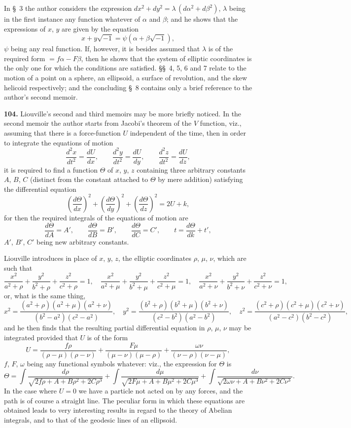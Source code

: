 \documentclass[11pt,a4paper]{article}
\theoremstyle{definition}
\begin{document}
In \S~3 the author considers the expression $dx^2 + dy^2 = \lambda\,(d\alpha^2 + d\beta^2)$, $\lambda$ being in the first instance any function whatever of $\alpha$ and $\beta$; and he shows that the expressions of $x$, $y$ are given by the equation
\[
x + y\sqrt{-1} = \psi(\alpha + \beta\sqrt{-1}),
\]
$\psi$ being any real function. If, however, it is besides assumed that $\lambda$ is of the required form $= f\alpha - F\beta$, then he shows that the system of elliptic coordinates is the only one for which the conditions are satisfied. \S\S~4, 5, 6 and 7 relate to the motion of a point on a sphere, an ellipsoid, a surface of revolution, and the skew helicoid respectively; and the concluding \S~8 contains only a brief reference to the author's second memoir.

\textbf{104.} Liouville's second and third memoirs may be more briefly noticed. In the second memoir the author starts from Jacobi's theorem of the $V$ function, viz., assuming that there is a force-function $U$ independent of the time, then in order to integrate the equations of motion
\[
\frac{d^2x}{dt^2} = \frac{dU}{dx}, \qquad \frac{d^2y}{dt^2} = \frac{dU}{dy}, \qquad \frac{d^2z}{dt^2} = \frac{dU}{dz},
\]
it is required to find a function $\Theta$ of $x$, $y$, $z$ containing three arbitrary constants $A$, $B$, $C$ (distinct from the constant attached to $\Theta$ by mere addition) satisfying the differential equation
\[
\left(\frac{d\Theta}{dx}\right)^2 + \left(\frac{d\Theta}{dy}\right)^2 + \left(\frac{d\Theta}{dz}\right)^2 = 2U + k,
\]
for then the required integrals of the equations of motion are
\[
\frac{d\Theta}{dA} = A', \qquad \frac{d\Theta}{dB} = B', \qquad \frac{d\Theta}{dC} = C', \qquad t = \frac{d\Theta}{dk} + t',
\]
$A'$, $B'$, $C'$ being new arbitrary constants.

Liouville introduces in place of $x$, $y$, $z$, the elliptic coordinates $\rho$, $\mu$, $\nu$, which are such that
\[
\frac{x^2}{a^2 + \rho} + \frac{y^2}{b^2 + \rho} + \frac{z^2}{c^2 + \rho} = 1, \quad
\frac{x^2}{a^2 + \mu} + \frac{y^2}{b^2 + \mu} + \frac{z^2}{c^2 + \mu} = 1, \quad
\frac{x^2}{a^2 + \nu} + \frac{y^2}{b^2 + \nu} + \frac{z^2}{c^2 + \nu} = 1,
\]
or, what is the same thing,
\[
x^2 = \frac{(a^2 + \rho)(a^2 + \mu)(a^2 + \nu)}{(b^2 - a^2)(c^2 - a^2)}, \quad
y^2 = \frac{(b^2 + \rho)(b^2 + \mu)(b^2 + \nu)}{(c^2 - b^2)(a^2 - b^2)}, \quad
z^2 = \frac{(c^2 + \rho)(c^2 + \mu)(c^2 + \nu)}{(a^2 - c^2)(b^2 - c^2)},
\]
and he then finds that the resulting partial differential equation in $\rho$, $\mu$, $\nu$ may be integrated provided that $U$ is of the form
\[
U = \frac{f\rho}{(\rho - \mu)(\rho - \nu)} + \frac{F\mu}{(\mu - \nu)(\mu - \rho)} + \frac{\omega\nu}{(\nu - \rho)(\nu - \mu)},
\]
$f$, $F$, $\omega$ being any functional symbols whatever: viz., the expression for $\Theta$ is
\[
\Theta = \int\!\frac{d\rho}{\sqrt{2f\rho + A + B\rho^2 + 2C\rho^3}}
+ \int\!\frac{d\mu}{\sqrt{2F\mu + A + B\mu^2 + 2C\mu^3}}
+ \int\!\frac{d\nu}{\sqrt{2\omega\nu + A + B\nu^2 + 2C\nu^3}}.
\]
In the case where $U = 0$ we have a particle not acted on by any forces, and the path is of course a straight line. The peculiar form in which these equations are obtained leads to very interesting results in regard to the theory of Abelian integrals, and to that of the geodesic lines of an ellipsoid.
\end{document}
